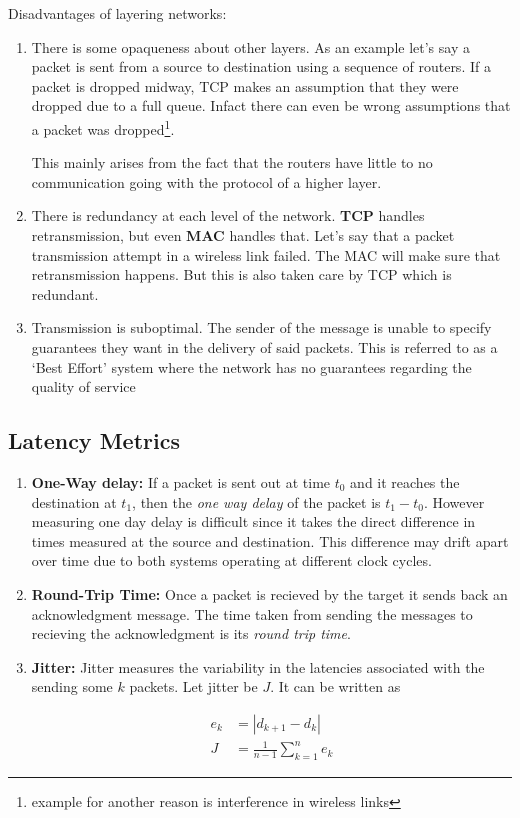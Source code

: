 \documentclass[12pt]{article}
\begin{document}
Disadvantages of layering networks:
\begin{enumerate}
    \item There is some opaqueness about other layers. As an example let's say 
    a packet is sent from a source to destination using a sequence of routers. If a packet is dropped midway, 
    TCP makes an assumption that they were dropped due to a full queue. Infact there can even be wrong assumptions that a 
    packet was dropped\footnote{example for another reason is interference in wireless links}. 

    This mainly arises from the fact that the routers have little to no communication going with the protocol of a higher layer. 

    \item There is redundancy at each level of the network. \textbf{TCP} handles retransmission, but even \textbf{MAC} handles that. 
    Let's say that a packet transmission attempt in a wireless link failed. The MAC will make sure that retransmission happens. But this is also taken care by TCP which is redundant.

    \item Transmission is suboptimal. The sender of the message is unable to specify guarantees they want in the delivery of said packets. This is referred to as a 
    `Best Effort' system where the network has no guarantees regarding the quality of service
\end{enumerate}



\subsection{Latency Metrics}

\begin{enumerate}
    \item \textbf{One-Way delay:} If a packet is sent out at time $t_0$ and it reaches the destination at $t_1$, then the \textit{one way delay} of the packet is $t_1 - t_0$. However measuring 
    one day delay is difficult since it takes the direct difference in times measured at the source and destination. This difference may drift apart over time due to both systems operating at different clock cycles.
    \item \textbf{Round-Trip Time:} Once a packet is recieved by the target it sends back an acknowledgment message. The time taken from sending the messages to recieving the acknowledgment is its \textit{round trip time}. 
    
    \item \textbf{Jitter:} Jitter measures the variability in the latencies associated with the sending some \(k\) packets. Let jitter be \(J\). It can be written as
    
    \begin{align*}
    e_k &= |d_{k+1} - d_{k}| \\
    J &= \frac{1}{n-1} \sum_{k=1}^n e_k 
    \end{align*}
\end{enumerate}
\end{document}
